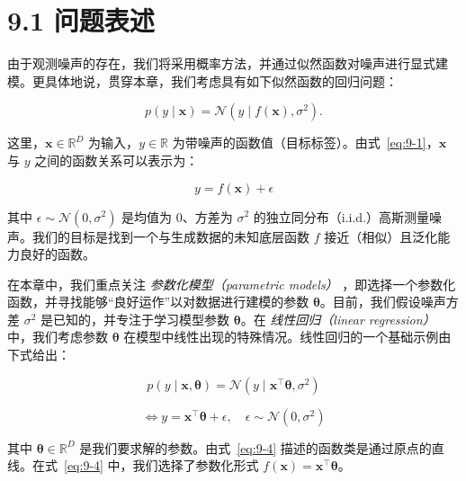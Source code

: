 \section*{9.1 问题表述}
\label{sec:9.1}

由于观测噪声的存在，我们将采用概率方法，并通过似然函数对噪声进行显式建模。更具体地说，贯穿本章，我们考虑具有如下似然函数的回归问题：

\begin{equation}
p(y \mid \boldsymbol{x}) = \mathcal{N}\left(y \mid f(\boldsymbol{x}), \sigma^2\right) .
\tag{9.1}\label{eq:9-1}
\end{equation}

这里，$ \boldsymbol{x} \in \mathbb{R}^D $ 为输入，$ y \in \mathbb{R} $ 为带噪声的函数值（目标标签）。由式~\eqref{eq:9-1}，$ \boldsymbol{x} $ 与 $ y $ 之间的函数关系可以表示为：

\begin{equation}
y = f(\boldsymbol{x}) + \epsilon
\tag{9.2}\label{eq:9-2}
\end{equation}

其中 $ \epsilon \sim \mathcal{N}(0, \sigma^2) $ 是均值为 0、方差为 $ \sigma^2 $ 的独立同分布（i.i.d.）高斯测量噪声。我们的目标是找到一个与生成数据的未知底层函数 $ f $ 接近（相似）且泛化能力良好的函数。

在本章中，我们重点关注 \emph{参数化模型（parametric models）} ，即选择一个参数化函数，并寻找能够“良好运作”以对数据进行建模的参数 $ \boldsymbol{\theta} $。目前，我们假设噪声方差 $ \sigma^2 $ 是已知的，并专注于学习模型参数 $ \boldsymbol{\theta} $。在 \emph{线性回归（linear regression）} 中，我们考虑参数 $ \boldsymbol{\theta} $ 在模型中线性出现的特殊情况。线性回归的一个基础示例由下式给出：

\begin{equation}
p(y \mid \boldsymbol{x}, \boldsymbol{\theta}) = \mathcal{N}\left(y \mid \boldsymbol{x}^\top \boldsymbol{\theta}, \sigma^2\right)
\tag{9.3}\label{eq:9-3}
\end{equation}

\begin{equation}
\iff y = \boldsymbol{x}^\top \boldsymbol{\theta} + \epsilon , \quad \epsilon \sim \mathcal{N}(0, \sigma^2)
\tag{9.4}\label{eq:9-4}
\end{equation}

其中 $ \boldsymbol{\theta} \in \mathbb{R}^D $ 是我们要求解的参数。由式~\eqref{eq:9-4} 描述的函数类是通过原点的直线。在式~\eqref{eq:9-4} 中，我们选择了参数化形式 $ f(\boldsymbol{x}) = \boldsymbol{x}^\top \boldsymbol{\theta} $。

